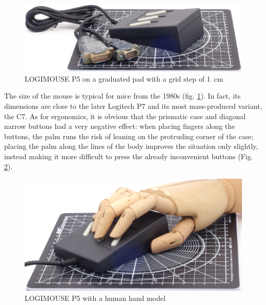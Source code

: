 \documentclass[11pt, a4paper]{article}
\begin{document}
\begin{figure}[h]
    \centering
    \includegraphics[scale=0.5]{1983_logitech_logimouse_p5/size_30.jpg}
    \caption{LOGIMOUSE P5 on a graduated pad with a grid step of 1~cm}
    \label{fig:LogimouseP5Size}
\end{figure}

The size of the mouse is typical for mice from the 1980s (fig. \ref{fig:LogimouseP5Size}). In fact, its dimensions are close to the later Logitech P7 and its most mass-produced variant, the C7. As for ergonomics, it is obvious that the prismatic case and diagonal narrow buttons had a very negative effect: when placing fingers along the buttons, the palm runs the risk of leaning on the protruding corner of the case; placing the palm along the lines of the body improves the situation only slightly, instead making it more difficult to press the already inconvenient buttons (Fig. \ref{fig:LogimouseP5Hand}).

\begin{figure}[h]
    \centering
    \includegraphics[scale=0.5]{1983_logitech_logimouse_p5/hand_30.jpg}
    \caption{LOGIMOUSE P5 with a human hand model}
    \label{fig:LogimouseP5Hand}
\end{figure}
\end{document}
